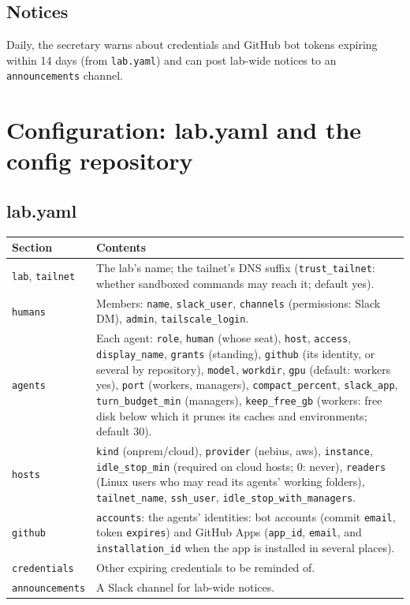 \documentclass[11pt]{article}
\newcommand{\code}[1]{\texttt{#1}}
\begin{document}
\subsection{Notices}
Daily, the secretary warns about credentials and GitHub bot tokens expiring within 14 days
(from \code{lab.yaml}) and can post lab-wide notices to an \code{announcements} channel.

\section{Configuration: lab.yaml and the config repository}

\subsection{lab.yaml}
\begin{tabularx}{\linewidth}{lL}
\toprule
Section & Contents \\
\midrule
\code{lab}, \code{tailnet} & The lab's name; the tailnet's DNS suffix
  (\code{trust\_tailnet}: whether sandboxed commands may reach it; default yes). \\
\code{humans} & Members: \code{name}, \code{slack\_user}, \code{channels} (permissions:
  Slack DM), \code{admin}, \code{tailscale\_login}. \\
\code{agents} & Each agent: \code{role}, \code{human} (whose seat), \code{host},
  \code{access}, \code{display\_name}, \code{grants} (standing), \code{github} (its
  identity, or several by repository), \code{model}, \code{workdir}, \code{gpu} (default:
  workers yes), \code{port} (workers, managers), \code{compact\_percent},
  \code{slack\_app}, \code{turn\_budget\_min} (managers), \code{keep\_free\_gb} (workers:
  free disk below which it prunes its caches and environments; default 30). \\
\code{hosts} & \code{kind} (onprem/cloud), \code{provider} (nebius, aws), \code{instance},
  \code{idle\_stop\_min} (required on cloud hosts; 0: never), \code{readers} (Linux users
  who may read its agents' working folders), \code{tailnet\_name}, \code{ssh\_user}, \code{idle\_stop\_with\_managers}. \\
\code{github} & \code{accounts}: the agents' identities: bot accounts (commit
  \code{email}, token \code{expires}) and GitHub Apps (\code{app\_id}, \code{email}, and
  \code{installation\_id} when the app is installed in several places). \\
\code{credentials} & Other expiring credentials to be reminded of. \\
\code{announcements} & A Slack channel for lab-wide notices. \\
\bottomrule
\end{tabularx}
\end{document}
